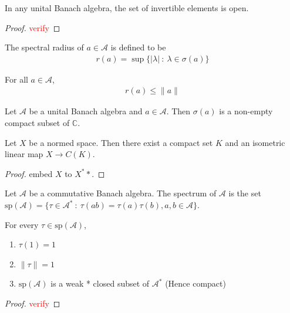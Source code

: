 \begin{lemma}
  In any unital Banach algebra, the set of invertible elements is open.
\end{lemma}
\begin{proof}
  \textcolor{red}{verify}
\end{proof}

\begin{definition}
  The spectral radius of $a \in \mathcal{A}$ is defined to be
  \begin{align*}
    r(a) = \sup \{ |\lambda|  \ : \   \lambda \in \sigma(a) \}
  \end{align*}
\end{definition}

\begin{lemma} For all $a \in \mathcal{A}$,
  \begin{align*}
    r(a) \le \|a\|
  \end{align*}
\end{lemma}

\begin{theorem}
  Let $\mathcal{A}$ be a unital Banach algebra and $a \in
  \mathcal{A}$. Then $\sigma(a)$ is a non-empty compact subset of $\mathbb{C}$.
\end{theorem}

\begin{lemma}
  Let $X$ be a normed space. Then there exist a compact set $K$ and
  an isometric linear map $X \to C(K)$.
\end{lemma}
\begin{proof}
  embed $X$ to $X^**$.
\end{proof}

\begin{definition}
  Let $\mathcal{A}$ be a commutative Banach algebra. The spectrum of
  $\mathcal{A}$ is the set $\textrm{sp}(\mathcal{A}) = \{ \tau \in
  \mathcal{A}^*  \ : \  \tau(ab) = \tau(a)\tau(b), a, b \in \mathcal{A} \}$.
\end{definition}

\begin{lemma}
  For every $\tau \in \textrm{sp}(\mathcal{A})$,
  \begin{enumerate}
    \item $\tau(1) = 1$
    \item $\|\tau\| = 1$
    \item $ \textrm{sp}(\mathcal{A})$ is a weak * closed subset of
      $\mathcal{A}^*$ (Hence compact)
  \end{enumerate}
\end{lemma}
\begin{proof}
  \textcolor{red}{verify}
\end{proof}
